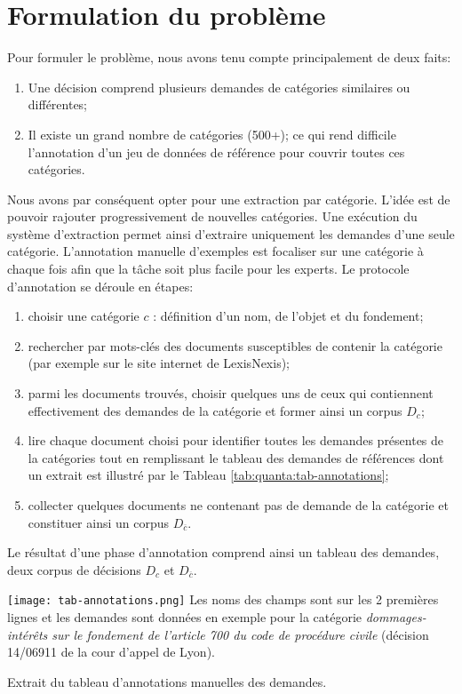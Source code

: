 \section{Formulation du problème}
\label{sec:quanta:formulation}
Pour formuler le problème, nous avons tenu compte principalement de deux faits:
\begin{enumerate}
    \item Une décision comprend plusieurs demandes de catégories similaires ou différentes;
    \item  Il existe un grand nombre de catégories (500+); ce qui rend difficile l'annotation d'un jeu de données de référence pour couvrir toutes ces catégories.
\end{enumerate}

Nous avons par conséquent opter pour une extraction par catégorie. L'idée est de pouvoir  rajouter progressivement de nouvelles catégories. Une exécution du système d'extraction permet ainsi d'extraire uniquement les demandes d'une seule catégorie. L'annotation manuelle d'exemples est focaliser sur une catégorie à chaque fois afin que la tâche soit plus facile pour les experts. Le protocole d'annotation se déroule en étapes: 
\begin{enumerate}
    \item choisir une catégorie $c$ : définition d'un nom, de l'objet et du fondement;
    \item rechercher par mots-clés des documents susceptibles de contenir la catégorie (par exemple sur le site internet de LexisNexis);
    \item parmi les documents trouvés, choisir quelques uns de ceux qui contiennent effectivement des demandes de la catégorie et former ainsi un corpus $D_{c}$; 
    \item lire chaque document choisi pour identifier toutes les demandes présentes de la catégories tout en remplissant le tableau des demandes de références dont un extrait est illustré par le Tableau \ref{tab:quanta:tab-annotations};
    \item collecter quelques documents ne contenant pas de demande de la catégorie et constituer ainsi un corpus $D_{\overline{c}}$.
\end{enumerate}

Le résultat d'une phase d'annotation comprend ainsi un tableau des demandes, deux corpus de décisions $D_{c}$ et $D_{\overline{c}}$.

\begin{table}[!htb]
\texttt{[image: tab-annotations.png]}
\scriptsize{Les noms des champs sont sur les 2 premières lignes et les demandes sont données en exemple pour la catégorie \textit{dommages-intérêts sur le fondement de l'article 700 du code de procédure civile} (décision 14/06911 de la cour d'appel de Lyon).}
\caption{Extrait du tableau d'annotations manuelles des demandes.} \label{tab:quanta:tab-annotations}
\end{table}

